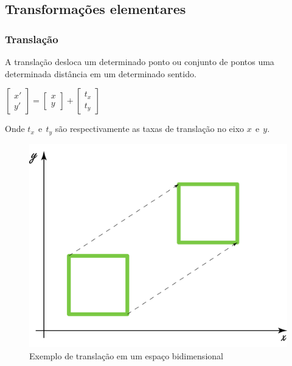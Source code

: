 \documentclass[9pt, a4paper, nofonttune, journal]{IEEEtran}
\begin{document}
\subsection{Transformações elementares}
\subsubsection{Translação}
A translação desloca um determinado ponto ou conjunto de pontos uma determinada distância em um determinado sentido.

\begin{center}
$\begin{bmatrix}x'\\
y'
\end{bmatrix}=\begin{bmatrix}x\\
y
\end{bmatrix}+\begin{bmatrix}t_{x}\\
t_{y}
\end{bmatrix}$\end{center}
Onde $t_{x}~~ \textrm{e} ~~ t_{y}$ são respectivamente as taxas de translação no eixo $x~~ \textrm{e} ~~y$.\cite{CGPPBook1}


\begin{figure}[H]
\begin{center}
\includegraphics[scale=0.25]{figuras/translation1}
\caption{Exemplo de translação em um espaço bidimensional}
\end{center}
\end{figure}
\end{document}
